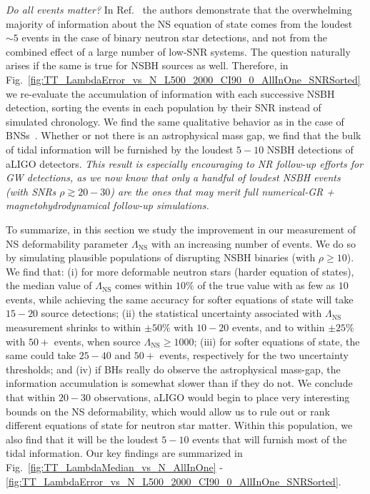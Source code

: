 \documentclass[aps,prd,amsmath,floats,floatfix, twocolumn,
superscriptaddress,nofootinbib,showpacs]{revtex4-1}
\newcommand{\lambdans}{\Lambda_\mathrm{NS}}
\begin{document}
{\it Do all events matter?} In Ref.~\cite{Lackey2014} the authors demonstrate
that the overwhelming majority of information about the NS equation of state
comes from the loudest $\sim 5$ events in the case of binary neutron star
detections, and not from the combined effect of a large number of low-SNR
systems.
The question naturally arises if the same is true for NSBH sources as well.
Therefore, in Fig.~\ref{fig:TT_LambdaError_vs_N_L500_2000_CI90_0_AllInOne_SNRSorted}
we re-evaluate the accumulation of information with each successive NSBH 
detection, sorting the events in each population by their SNR instead of 
simulated chronology. We find the same qualitative behavior as in the case of 
BNSs~\cite{Lackey2014}. 
Whether or not there is an astrophysical mass gap, we find
that the bulk of tidal information will be furnished by the loudest $5-10$
NSBH detections of aLIGO detectors. {\it This result is especially encouraging
to NR follow-up efforts for GW detections, as we now know that only a handful
of loudest NSBH events (with SNRs $\rho\gtrsim 20-30$) are the ones that may merit
full numerical-GR + magnetohydrodynamical follow-up simulations.}



To summarize, in this section we study the improvement in our measurement of 
NS deformability parameter $\lambdans$ with an increasing number of events. We
do so by simulating plausible populations of disrupting NSBH binaries (with
$\rho\geq 10$). We find that:
(i) for more deformable neutron stars (harder equation of states), the median
value of $\lambdans$ comes within $10\%$ of the true value with as 
few as $10$ events, while achieving the same accuracy for softer equations of 
state will take $15-20$ source detections; (ii) the statistical uncertainty
associated with $\lambdans$ measurement shrinks to within $\pm50\%$ with
$10-20$ events, and to within $\pm 25\%$ with $50+$ events, when source 
$\lambdans\geq 1000$; (iii) for softer equations of state, the same could take
$25-40$ and $50+$ events, respectively for the two uncertainty thresholds;
and (iv) if BHs really do observe the astrophysical mass-gap, the information
accumulation is somewhat slower than if they do not. We conclude that within
$20-30$ observations, aLIGO would begin to place very interesting bounds on 
the NS deformability, which would allow us to rule out or rank different
equations of state for neutron star matter. Within this population, we also
find that it will be the loudest $5-10$ events that will furnish most of the
tidal information. Our key findings are summarized in 
Fig.~\ref{fig:TT_LambdaMedian_vs_N_AllInOne} -
\ref{fig:TT_LambdaError_vs_N_L500_2000_CI90_0_AllInOne_SNRSorted}.
\end{document}
